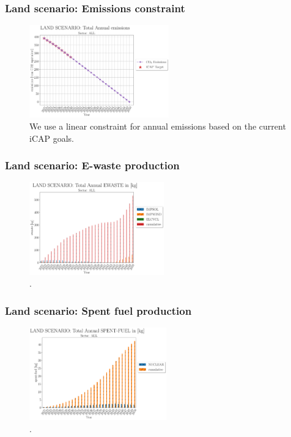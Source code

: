 \begin{frame}
  \frametitle{Land scenario: Emissions constraint}
  \begin{figure}[htbp!]
    \begin{center}
      \includegraphics[height=4cm]{./images/land scenario_all_emissions_co2eq.png}
    \end{center}
    \caption{We use a linear constraint for annual emissions based on the current iCAP goals.} 
    \label{fig:land-emissionsgoal}
  \end{figure}
\end{frame}

\begin{frame}
  \frametitle{Land scenario: E-waste production}
  \begin{figure}[htbp!]
    \begin{center}
      \includegraphics[height=4cm]{./images/land scenario_all_emissions_ewaste.png}
    \end{center}
    \caption{.} 
    \label{fig:land-ewaste}
  \end{figure}
\end{frame}

\begin{frame}
  \frametitle{Land scenario: Spent fuel production}
  \begin{figure}[htbp!]
    \begin{center}
      \includegraphics[height=4cm]{./images/land scenario_all_emissions_spent-fuel.png}
    \end{center}
    \caption{.} 
    \label{fig:land-spentfuel}
  \end{figure}
\end{frame}


